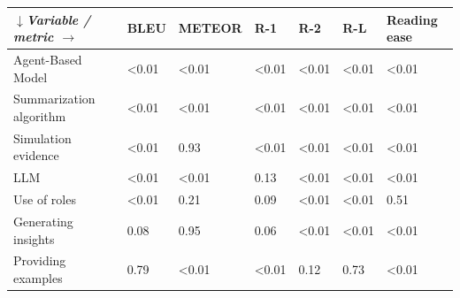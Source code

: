\begin{tabular}{|l|l|l|l|l|l|l|}
\hline
\textit{$\downarrow$Variable / metric $\rightarrow$} & BLEU & METEOR & R-1 & R-2 & R-L & Reading ease \\
 \hline
 Agent-Based Model & \textless{}0.01 & \textless{}0.01 & \textless{}0.01 & \textless{}0.01 & \textless{}0.01 & \textless{}0.01 \\
 \hline
 Summarization algorithm & \textless{}0.01 & \textless{}0.01 & \textless{}0.01 & \textless{}0.01 & \textless{}0.01 & \textless{}0.01 \\
 \hline
 Simulation evidence & \textless{}0.01 & 0.93 & \textless{}0.01 & \textless{}0.01 & \textless{}0.01 & \textless{}0.01 \\
 \hline
 LLM & \textless{}0.01 & \textless{}0.01 & 0.13 & \textless{}0.01 & \textless{}0.01 & \textless{}0.01 \\
 \hline
 Use of roles & \textless{}0.01 & 0.21 & 0.09 & \textless{}0.01 & \textless{}0.01 & 0.51 \\
 \hline
 Generating insights & 0.08 & 0.95 & 0.06 & \textless{}0.01 & \textless{}0.01 & \textless{}0.01 \\
 \hline
 Providing examples & 0.79 & \textless{}0.01 & \textless{}0.01 & 0.12 & 0.73 & \textless{}0.01 \\
\hline
\end{tabular}
